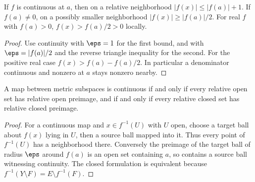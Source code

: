 \begin{proposition}
If $f$ is continuous at $a$, then on a relative neighborhood $|f(x)|\le|f(a)|+1$. If $f(a)\ne0$, on a possibly smaller neighborhood $|f(x)|\ge|f(a)|/2$. For real $f$ with $f(a)>0$, $f(x)>f(a)/2>0$ locally.
\end{proposition}
\begin{proof}
Use continuity with $\eps=1$ for the first bound, and with $\eps=|f(a)|/2$ and the reverse triangle inequality for the second. For the positive real case $f(x)>f(a)-f(a)/2$. In particular a denominator continuous and nonzero at $a$ stays nonzero nearby.
\end{proof}

\begin{theorem}
A map between metric subspaces is continuous if and only if every relative open set has relative open preimage, and if and only if every relative closed set has relative closed preimage.
\end{theorem}
\begin{proof}
For a continuous map and $x\in f^{-1}(U)$ with $U$ open, choose a target ball about $f(x)$ lying in $U$, then a source ball mapped into it. Thus every point of $f^{-1}(U)$ has a neighborhood there. Conversely the preimage of the target ball of radius $\eps$ around $f(a)$ is an open set containing $a$, so contains a source ball witnessing continuity. The closed formulation is equivalent because $f^{-1}(Y\setminus F)=E\setminus f^{-1}(F)$.
\end{proof}

